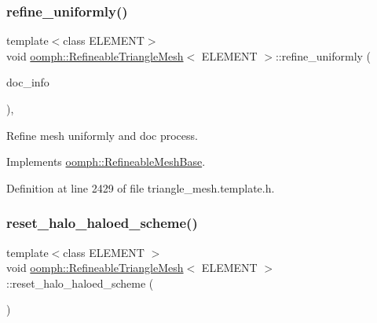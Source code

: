 \mbox{\label{classoomph_1_1RefineableTriangleMesh_a4820744f95d69328dfa4185fff21dd7b}} 
\subsubsection{\texorpdfstring{refine\+\_\+uniformly()}{refine\_uniformly()}}
{\footnotesize\ttfamily template$<$class E\+L\+E\+M\+E\+NT$>$ \\
void \hyperlink{classoomph_1_1RefineableTriangleMesh}{oomph\+::\+Refineable\+Triangle\+Mesh}$<$ E\+L\+E\+M\+E\+NT $>$\+::refine\+\_\+uniformly (\begin{DoxyParamCaption}\item[{\hyperlink{classoomph_1_1DocInfo}{Doc\+Info} \&}]{doc\+\_\+info }\end{DoxyParamCaption})\hspace{0.3cm}{\ttfamily [inline]}, {\ttfamily [virtual]}}



Refine mesh uniformly and doc process. 



Implements \hyperlink{classoomph_1_1RefineableMeshBase_afe5810e718ce1939f3f81e3eb5743768}{oomph\+::\+Refineable\+Mesh\+Base}.



Definition at line 2429 of file triangle\+\_\+mesh.\+template.\+h.

\mbox{\label{classoomph_1_1RefineableTriangleMesh_a9ba5601a6630b8c2c2ee75fe11d2c6be}} 
\subsubsection{\texorpdfstring{reset\+\_\+halo\+\_\+haloed\+\_\+scheme()}{reset\_halo\_haloed\_scheme()}}
{\footnotesize\ttfamily template$<$class E\+L\+E\+M\+E\+NT $>$ \\
void \hyperlink{classoomph_1_1RefineableTriangleMesh}{oomph\+::\+Refineable\+Triangle\+Mesh}$<$ E\+L\+E\+M\+E\+NT $>$\+::reset\+\_\+halo\+\_\+haloed\+\_\+scheme (\begin{DoxyParamCaption}{ }\end{DoxyParamCaption})\hspace{0.3cm}{\ttfamily [protected]}}



